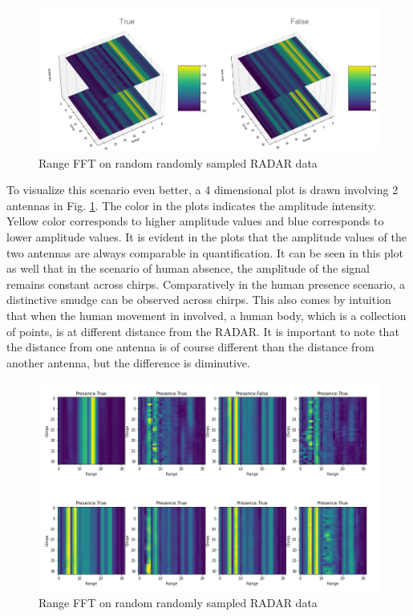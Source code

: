 \begin{figure}[ht]
  \begin{center}
    \includegraphics[width=1\textwidth]{Master's thesis/images/4d_fft.PNG} 
    \caption{Range FFT on random randomly sampled RADAR data}
    \label{fig:FFT_4d2a}
  \end{center}
\end{figure}   

To visualize this scenario even better, a 4 dimensional plot is drawn involving 2 antennas in Fig. \ref{fig:FFT_4d2a}. The color in the plots indicates the amplitude intensity. Yellow color corresponds to higher amplitude values and blue corresponds to lower amplitude values. It is evident in the plots that the amplitude values of the two antennas are always comparable in quantification. It can be seen in this plot as well that in the scenario of human absence, the amplitude of the signal remains constant across chirps. Comparatively in the human presence scenario, a distinctive smudge can be observed across chirps. This also comes by intuition that when the human movement in involved, a human body, which is a collection of points, is at different distance from the RADAR. It is important to note that the distance from one antenna is of course different than the distance from another antenna, but the difference is diminutive. 




\begin{figure}[ht]
  \begin{center}
    \includegraphics[width=01\textwidth]{Master's thesis/images/fft_1_antenna.PNG} 
    \caption{Range FFT on random randomly sampled RADAR data}
    \label{fig:FFT_plot}
  \end{center}
\end{figure}  

